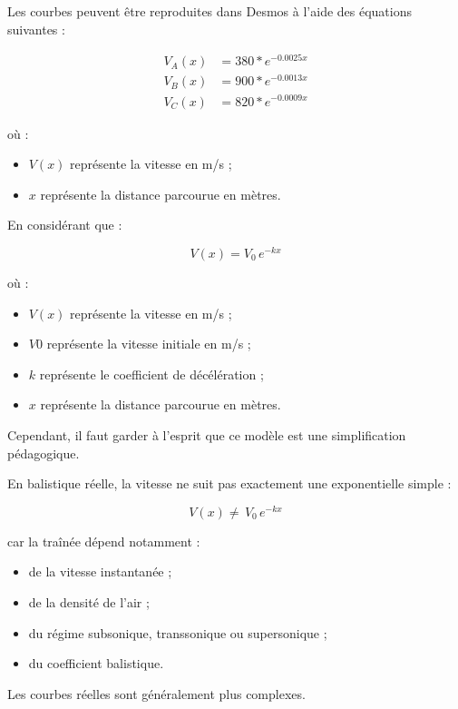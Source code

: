 Les courbes peuvent être reproduites dans Desmos à l'aide des équations suivantes :

\begin{align}
V_A(x) &= 380*e^{-0.0025x} \\
V_B(x) &= 900*e^{-0.0013x} \\
V_C(x) &= 820*e^{-0.0009x}
\end{align}

où :

\begin{itemize}
\item $V(x)$ représente la vitesse en m/s ;
\item $x$ représente la distance parcourue en mètres.
\end{itemize}

En considérant que :

\begin{equation}
V(x)=V_0\,e^{-kx}
\end{equation}

où :

\begin{itemize}
\item $V(x)$ représente la vitesse en m/s ;
\item $V0$ représente la vitesse initiale en m/s ;
\item $k$ représente le coefficient de décélération ;
\item $x$ représente la distance parcourue en mètres.
\end{itemize}


Cependant, il faut garder à l'esprit que ce modèle est une simplification pédagogique.

En balistique réelle, la vitesse ne suit pas exactement une exponentielle simple :

\begin{equation}
V(x)\neq\,V_0\,e^{-kx}
\end{equation}

car la traînée dépend notamment :

\begin{itemize}
\item de la vitesse instantanée ;
\item de la densité de l'air ;
\item du régime subsonique, transsonique ou supersonique ;
\item du coefficient balistique.
\end{itemize}

Les courbes réelles sont généralement plus complexes.

